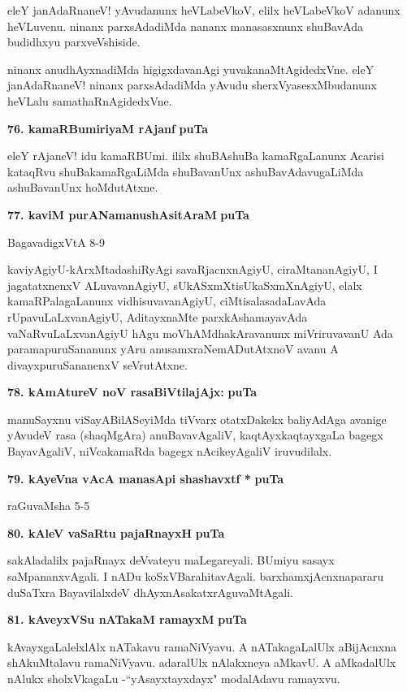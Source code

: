 eleY janAdaRnaneV! yAvudanunx heVLabeVkoV, elilx heVLabeVkoV adanunx heVLuvenu. ninanx parxsAdadiMda nananx manasasxnunx shuBavAda budidhxyu parxveVshiside.

\eject

ninanx anudhAyxnadiMda higigxdavanAgi yuvakanaMtAgidedxVne. eleY janAdaRnaneV! ninanx parxsAdadiMda yAvudu sherxVyasesxMbudanunx heVLalu samathaRnAgidedxVne.

\medskip
\noindent
\textbf{76. kamaRBumiriyaM rAjanf} \hfill{\bf puTa }

\smallskip
eleY rAjaneV! idu kamaRBUmi. ililx shuBAshuBa kamaRgaLanunx Acarisi kataqRvu shuBakamaRgaLiMda shuBavanUnx ashuBavAdavugaLiMda ashuBavanUnx hoMdutAtxne.

\medskip
\noindent
\textbf{77. kaviM purANamanushAsitAraM} \hfill{\bf puTa }

\hfill{BagavadigxVtA 8-9}

\smallskip
kaviyAgiyU-kArxMtadashiRyAgi savaRjacnxnAgiyU, ciraMtananAgiyU, I jagatatxnenxV ALuvavanAgiyU, sUkASxmXtisUkaSxmXnAgiyU, elalx kamaRPalagaLanunx vidhisuvavanAgiyU, ciMtisalasadaLavAda rUpavuLaLxvanAgiyU, AditayxnaMte parxkAshamayavAda vaNaRvuLaLxvanAgiyU hAgu moVhAMdhakAravanunx miVriruvavanU Ada paramapuruSananunx yAru anusamxraNemADutAtxnoV avanu A divayxpuruSananenxV seVrutAtxne.


\medskip
\noindent
\textbf{78. kAmAtureV noV rasaBiVtilajAjx:} \hfill{\bf puTa }

\smallskip
manuSayxnu viSayABilASeyiMda tiVvarx otatxDakekx baliyAdAga avanige yAvudeV rasa (shaqMgAra) anuBavavAgaliV, kaqtAyxkaqtayxgaLa bagegx BayavAgaliV, niVcakamaRda bagegx nAcikeyAgaliV iruvudilalx.


\smallskip
\noindent
\textbf{79. kAyeVna vAcA manasApi shashavxtf *} \hfill{\bf puTa }

\hfill{raGuvaMsha 5-5}

\medskip
\noindent
\textbf{80. kAleV vaSaRtu pajaRnayxH} \hfill{\bf puTa }

\smallskip
sakAladalilx pajaRnayx deVvateyu maLegareyali. BUmiyu sasayx saMpananxvAgali. I nADu koSxVBarahitavAgali. barxhamxjAcnxnapararu duSaTxra BayavilalxdeV dhAyxnAsakatxrAguvaMtAgali.

\medskip
\noindent
\textbf{81. kAveyxVSu nATakaM ramayxM} \hfill{\bf puTa }

\smallskip
kAvayxgaLalelxlAlx nATakavu ramaNiVyavu. A nATakagaLalUlx aBijAcnxna shAkuMtalavu ramaNiVyavu. adaralUlx nAlakxneya aMkavU. A aMkadalUlx nAlukx sholxVkagaLu -``yAsayxtayxdayx" modalAdavu ramayxvu.

